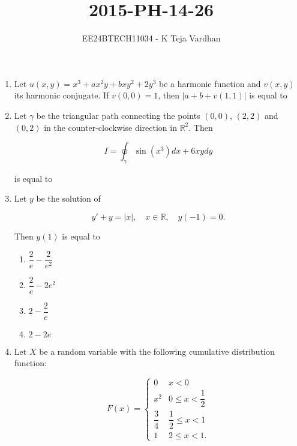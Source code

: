 \documentclass[journal]{IEEEtran}
\newcommand{\brak}[1]{\left( #1 \right)}
\newcommand{\abs}[1]{\left| #1 \right|}
\newcommand{\lt}{<}
\begin{document}

\title{2015-PH-14-26}
\author{EE24BTECH11034 - K Teja Vardhan}
{\let\newpage\relax\maketitle}

\begin{enumerate}

\item Let $u\brak{x,y} = x^3 + a x^2 y + b x y^2 + 2 y^3$ be a harmonic function and $v\brak{x,y}$ its harmonic conjugate. If $v\brak{0,0} = 1$, then $\abs{a + b + v\brak{1,1}}$ is equal to \underline{\hspace{2cm}}

\item Let $\gamma$ be the triangular path connecting the points $\brak{0,0}$, $\brak{2,2}$ and $\brak{0,2}$ in the counter-clockwise direction in $\mathbb{R}^2$. Then

    $$I = \oint_{\gamma}  
    \sin\brak{x^3}dx + 6 x y dy$$

    is equal to \underline{\hspace{2cm}}

\item Let $y$ be the solution of 

    $$y\prime + y = \abs{x}, \quad x \in \mathbb{R}, \quad y\brak{-1} = 0.$$

    Then $y\brak{1}$ is equal to

    \begin{enumerate}
        \item $\dfrac{2}{e} - \dfrac{2}{e^2}$
        \item $\dfrac{2}{e} - 2 e^2$
        \item $2 - \dfrac{2}{e}$
        \item $2 - 2 e$
    \end{enumerate}

\item Let $X$ be a random variable with the following cumulative distribution function:

    $$F\brak{x} = \begin{cases}
        0 & x \lt 0 \\
        x^2 & 0 \leq x \lt \dfrac{1}{2} \\
        \dfrac{3}{4} & \dfrac{1}{2} \leq x \lt 1 \\
        1 & 2 \leq x \lt 1.
    \end{cases}$$


\end{enumerate}
\end{document}
